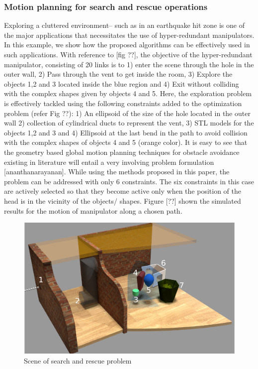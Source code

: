 \documentclass[12pt,a4]{article}
\begin{document}
\subsubsection{Motion planning for search and rescue operations}
Exploring a cluttered environment-- such as in an earthquake hit zone is one of the major applications that necessitates the use of hyper-redundant manipulators. In this example, we show how the proposed algorithms can be effectively used in such applications. With reference to [fig ??], the objective of the hyper-redundant manipulator, consisting of 20 links is to 1) enter the scene through the hole in the outer wall, 2) Pass through the vent to get inside the room, 3) Explore the objects 1,2 and 3 located inside the blue region and 4) Exit without colliding with the complex shapes given by objects 4 and 5. Here, the exploration problem is effectively tackled using the following constraints added to the optimization problem (refer Fig ??): 1) An ellipsoid of the size of the hole located in the outer wall 2) collection of cylindrical ducts to represent the vent, 3) STL models for the objects 1,2 and 3 and 4) Ellipsoid at the last bend in the path to avoid collision with the complex shapes of objects 4 and 5 (orange color). It is easy to see that the geometry based global motion planning techniques for obstacle avoidance existing in literature will entail a very involving problem formulation [ananthanarayanan]. While using the methods proposed in this paper, the problem can be addressed with only 6 constraints. The six constraints in this case are actively selected so that they become active only when the position of the head is in the vicinity of the objects/ shapes. Figure [??] shown the simulated results for the motion of manipulator along a chosen path. 

\begin{figure}[h!]
\centering
\includegraphics[scale=0.65]{figures/figscene.pdf}
\caption{ Scene of search and rescue problem \label{fig:scene}}
\end{figure}
\end{document}
